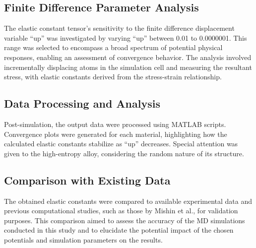 \documentclass[a4paper,11pt]{article} %
\begin{document}
\subsection*{Finite Difference Parameter Analysis}
The elastic constant tensor's sensitivity to the finite difference displacement variable ``up'' was investigated by varying ``up'' between 0.01 to 0.0000001. This range was selected to encompass a broad spectrum of potential physical responses, enabling an assessment of convergence behavior. The analysis involved incrementally displacing atoms in the simulation cell and measuring the resultant stress, with elastic constants derived from the stress-strain relationship.

\subsection*{Data Processing and Analysis}
Post-simulation, the output data were processed using MATLAB scripts. Convergence plots were generated for each material, highlighting how the calculated elastic constants stabilize as ``up'' decreases. Special attention was given to the high-entropy alloy, considering the random nature of its structure.

\subsection*{Comparison with Existing Data}
The obtained elastic constants were compared to available experimental data and previous computational studies, such as those by Mishin et al., for validation purposes. This comparison aimed to assess the accuracy of the MD simulations conducted in this study and to elucidate the potential impact of the chosen potentials and simulation parameters on the results.
\end{document}
